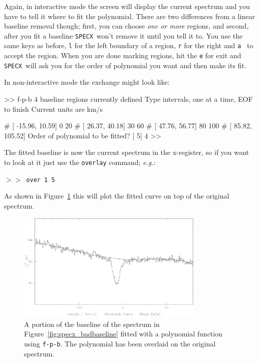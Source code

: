 \documentclass[11pt,twoside]{starlink}
\providecommand{\eg}{\textit{e.g.}}
\providecommand{\SPECX}{\texttt{SPECX}}
\providecommand{\SP}{{$>\!>$}}
\begin{document}
Again, in interactive mode the screen will display the current
spectrum and you have to tell it where to fit the polynomial.  There
are two differences from a linear baseline removal though; first, you
can choose \textit{one or more} regions, and second, after you fit a
baseline \SPECX\
won't remove it until you tell it to.  You use the same keys as
before, \texttt{l} for the left boundary of a region, \texttt{r} for the
right and \texttt{a } to accept the region. When you are done marking
regions, hit the \texttt{e} for exit and \SPECX\ will ask you for the
order of polynomial you want and then make its fit.

In non-interactive mode the exchange might look like:
\begin{terminalv}

 >> f-p-b
   4 baseline regions currently defined
  Type intervals, one at a time, EOF to finish
 Current units are km/s

 # [  -15.96,   10.59] 0 20
 # [   26.37,   40.18] 30 60
 # [   47.76,   56.77] 80 100
 # [   85.82,  105.52]
 Order of polynomial to be fitted? [ 5] 4
 >>
\end{terminalv}

The fitted baseline is now the current spectrum in the x-register, so if
you want to
look at it just use the \texttt{overlay} command; \eg :

\SP\ \verb|over 1 5|

As shown in Figure~\ref{fig:specx_fpb} this will plot the fitted curve
on top of the original spectrum.

\begin{figure}[htb]
\centering
\includegraphics[width=0.8\textwidth]{sc8_fpb}
\caption[A polynomial baseline fit]
{\small{A portion of the baseline of the spectrum in
Figure~\ref{fig:specx_badbaseline} fitted with a polynomial function
using \texttt{f-p-b}. The polynomial has been overlaid on the original
spectrum.  }}
\label{fig:specx_fpb}
\end{figure}
\end{document}
